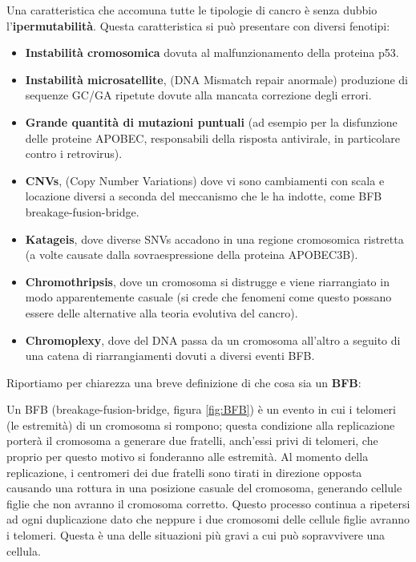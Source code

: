 \documentclass[a4paper]{article}
\begin{document}
	Una caratteristica che accomuna tutte le tipologie di cancro è senza dubbio l'\textbf{ipermutabilità}. Questa caratteristica si può presentare con diversi fenotipi: 

	\begin{itemize}
	\item \textbf{Instabilità cromosomica} dovuta al malfunzionamento della proteina p53.
	\item \textbf{Instabilità microsatellite}, (DNA Mismatch repair anormale) produzione di sequenze GC/GA ripetute dovute alla mancata correzione degli errori.
	\item \textbf{Grande quantità di mutazioni puntuali} (ad esempio per la disfunzione delle proteine APOBEC, responsabili della risposta antivirale, in particolare contro i retrovirus).
	\item \textbf{CNVs}, (Copy Number Variations) dove vi sono cambiamenti con scala e locazione diversi a seconda del meccanismo che le ha indotte, come BFB breakage-fusion-bridge.
	\item \textbf{Katageis}, dove diverse SNVs accadono in una regione cromosomica ristretta (a volte causate dalla sovraespressione della proteina APOBEC3B).
	\item \textbf{Chromothripsis}, dove un cromosoma si distrugge e viene riarrangiato in modo apparentemente casuale (si crede che fenomeni come questo possano essere delle alternative alla teoria evolutiva del cancro).
	\item \textbf{Chromoplexy}, dove del DNA passa da un cromosoma all'altro a seguito di una catena di riarrangiamenti dovuti a diversi eventi BFB.
	\end{itemize}%
	

	Riportiamo per chiarezza una breve definizione di che cosa sia un \textbf{BFB}:

	Un BFB (breakage-fusion-bridge, figura \ref{fig:BFB}) è un evento in cui i telomeri (le estremità) di un cromosoma si rompono; questa condizione alla replicazione porterà il cromosoma a generare 
	due fratelli, anch'essi privi di telomeri, che proprio per questo motivo si fonderanno alle estremità. Al momento
	della replicazione, i centromeri dei due fratelli sono tirati in direzione opposta causando una
	rottura in una posizione casuale del cromosoma, generando cellule figlie che non avranno il cromosoma corretto.
	Questo processo continua a ripetersi ad ogni duplicazione dato che neppure i due cromosomi delle cellule figlie avranno i
	telomeri. Questa è una delle situazioni più gravi a cui può sopravvivere una cellula.
	
\end{document}
